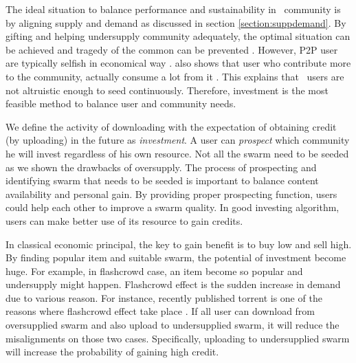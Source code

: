 The ideal situation to balance performance and sustainability in \bt~community is by aligning supply and demand as discussed in section \ref{section:suppdemand}. By gifting and helping undersupply community adequately, the optimal situation can be achieved and tragedy of the common can be prevented \cite{2002:reputationtotragedy:milinski}. However, P2P user are typically selfish in economical way \cite{2014:userbehaviourprivate:jia}. \citeauthor{2009:demandsupplyres:andrade} also shows that user who contribute more to the community, actually consume a lot from it \cite{2009:demandsupplyres:andrade}. This explains that \bt~users are not altruistic enough to seed continuously. Therefore, investment is the most feasible method to balance user and community needs.

We define the activity of downloading with the expectation of obtaining credit (by uploading) in the future as \textit{investment}. A user can \textit{prospect} which community he will invest regardless of his own resource. Not all the swarm need to be seeded as we shown the drawbacks of oversupply. The process of prospecting and identifying swarm that needs to be seeded is important to balance content availability and personal gain. By providing proper prospecting function, users could help each other to improve a swarm quality. In good investing algorithm, users can make better use of its resource to gain credits.

In classical economic principal, the key to gain benefit is to buy low and sell high. By finding popular item and suitable swarm, the potential of investment become huge. For example, in flashcrowd case, an item become so popular and undersupply might happen. Flashcrowd effect is the sudden increase in demand due to various reason. For instance, recently published torrent is one of the reasons where flashcrowd effect take place \cite{2013:swarmevolution:su}. If all user can download from oversupplied swarm and also upload to undersupplied swarm, it will reduce the misalignments on those two cases. Specifically, uploading to undersupplied swarm will increase the probability of gaining high credit.





